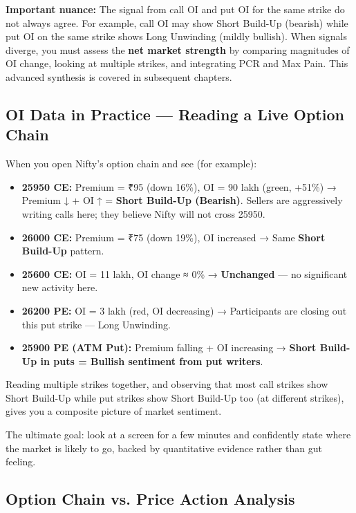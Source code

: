 \documentclass[12pt,openany]{book}
\begin{document}
\textbf{Important nuance:} The signal from call OI and put OI for the same strike do not always agree. For example, call OI may show Short Build-Up (bearish) while put OI on the same strike shows Long Unwinding (mildly bullish). When signals diverge, you must assess the \textbf{net market strength} by comparing magnitudes of OI change, looking at multiple strikes, and integrating PCR and Max Pain. This advanced synthesis is covered in subsequent chapters.

\subsection{OI Data in Practice — Reading a Live Option Chain}

When you open Nifty's option chain and see (for example):

\begin{itemize}[leftmargin=*]
    \item \textbf{25950 CE:} Premium = ₹95 (down 16\%), OI = 90 lakh (green, +51\%) → Premium ↓ + OI ↑ = \textbf{Short Build-Up (Bearish)}. Sellers are aggressively writing calls here; they believe Nifty will not cross 25950.
    \item \textbf{26000 CE:} Premium = ₹75 (down 19\%), OI increased → Same \textbf{Short Build-Up} pattern.
    \item \textbf{25600 CE:} OI = 11 lakh, OI change ≈ 0\% → \textbf{Unchanged} — no significant new activity here.
    \item \textbf{26200 PE:} OI = 3 lakh (red, OI decreasing) → Participants are closing out this put strike — Long Unwinding.
    \item \textbf{25900 PE (ATM Put):} Premium falling + OI increasing → \textbf{Short Build-Up in puts = Bullish sentiment from put writers}.
\end{itemize}

Reading multiple strikes together, and observing that most call strikes show Short Build-Up while put strikes show Short Build-Up too (at different strikes), gives you a composite picture of market sentiment.

The ultimate goal: look at a screen for a few minutes and confidently state where the market is likely to go, backed by quantitative evidence rather than gut feeling.


\subsection{Option Chain vs. Price Action Analysis}
\end{document}

